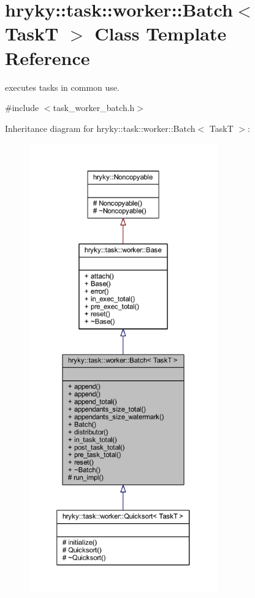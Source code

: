 \hypertarget{classhryky_1_1task_1_1worker_1_1_batch}{\section{hryky\-:\-:task\-:\-:worker\-:\-:Batch$<$ Task\-T $>$ Class Template Reference}
\label{classhryky_1_1task_1_1worker_1_1_batch}
}


executes tasks in common use.  




{\ttfamily \#include $<$task\-\_\-worker\-\_\-batch.\-h$>$}



Inheritance diagram for hryky\-:\-:task\-:\-:worker\-:\-:Batch$<$ Task\-T $>$\-:
\nopagebreak
\begin{figure}[H]
\begin{center}
\leavevmode
\includegraphics[height=550pt]{classhryky_1_1task_1_1worker_1_1_batch__inherit__graph}
\end{center}
\end{figure}
